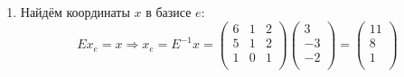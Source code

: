 \begin{enumerate}
\[			      \right]
		      \begin{array}{c}
			      +3 \text{III} \\
			      \\
			      \\
		      \end{array}
		      \sim
	      \]
	      \[
		      \sim
		      \left[
			      \begin{array}{ccc|ccc}
				      1 & 0 & 0 & 2 & -4 & 5  \\
				      0 & 0 & 1 & 0 & 1  & -2 \\
				      0 & 1 & 0 & 1 & -2 & 3  \\
			      \end{array}
			      \right]
		      \begin{array}{c}
			      \\
			      = \text{III} \\
			      = \text{II}  \\
		      \end{array}
		      \sim
		      \left[
			      \begin{array}{ccc|ccc}
				      1 & 0 & 0 & 2 & -4 & 5  \\
				      0 & 1 & 0 & 1 & -2 & 3  \\
				      0 & 0 & 1 & 0 & 1  & -2 \\
			      \end{array}
			      \right].
	      \]

	\item Найдём координаты $x$ в базисе $e$:
	      \[
		      E x_e = x \Rightarrow x_e = E^{-1} x =
		      \begin{pmatrix}
			      6 & 1 & 2 \\
			      5 & 1 & 2 \\
			      1 & 0 & 1 \\
		      \end{pmatrix}
		      \begin{pmatrix}
			      3  \\
			      -3 \\
			      -2 \\
		      \end{pmatrix} =
		      \begin{pmatrix}
			      11 \\
			      8  \\
			      1  \\
		      \end{pmatrix}
	      \]
\end{enumerate}